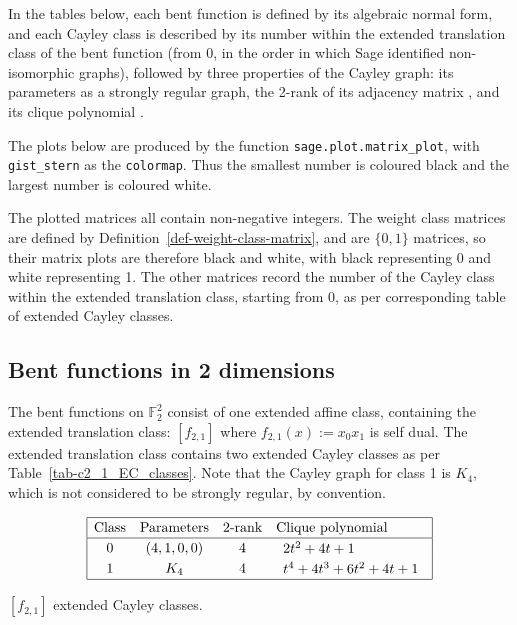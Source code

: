\documentclass[12pt,a4paper]{article}
\newcommand{\mb}[1]{\mathbb{#1}}
\newcommand{\F}{\mb{F}}
\begin{document}
In the tables below, each bent function is defined by its algebraic normal form, and each Cayley class is described by
its number within the extended translation class of the bent function (from 0, in the order in which Sage identified non-isomorphic graphs),
followed by three properties of the Cayley graph: its parameters as a strongly regular graph, the 2-rank of its adjacency matrix \cite{Brov92},
and its clique polynomial \cite{HoeL94}.

The plots below are produced by the function \texttt{sage.}\texttt{plot.}\texttt{matrix\_plot},
with \texttt{gist\_stern} as the \texttt{colormap}.
Thus the smallest number is coloured black and the largest number is coloured white.

The plotted matrices all contain non-negative integers.
The weight class matrices are defined by Definition~\ref{def-weight-class-matrix}, and are $\{0,1\}$ matrices,
so their matrix plots are therefore black and white, with black representing 0 and white representing 1.
The other matrices record the number of the Cayley class within the
extended translation class, starting from 0, as per corresponding table of extended Cayley classes.

\subsection{Bent functions in 2 dimensions}
%
The bent functions on $\F_2^2$ consist of one extended affine class, containing the extended translation class: $[f_{2,1}]$
where $f_{2,1}(x) := x_0 x_1$ is self dual.
The extended translation class contains two extended Cayley classes as per Table~\ref{tab-c2_1_EC_classes}.
Note that the Cayley graph for class 1 is $K_4$, which is not considered to be strongly regular, by convention.
\begin{table}[!bhpt] %
\small{
\begin{align*}
\def\arraystretch{1.2}
\begin{array}{|cccl|}
\hline
\text{Class} &
\text{Parameters} &
\text{2-rank} &
\text{Clique polynomial}
\\
\hline
0 &
(4, 1, 0, 0) &
4 &
\begin{array}{l}
2t^{2} + 4t + 1
\end{array}
\\
1 &
K_4 &
4 &
\begin{array}{l}
t^{4} + 4t^{3} + 6t^{2} + 4t + 1
\end{array}
\\
\hline
\end{array}
\end{align*}
}
\caption{$[f_{2,1}]$ extended Cayley classes.}
\label{tab-c2_1_EC_classes}
\end{table}
\end{document}
